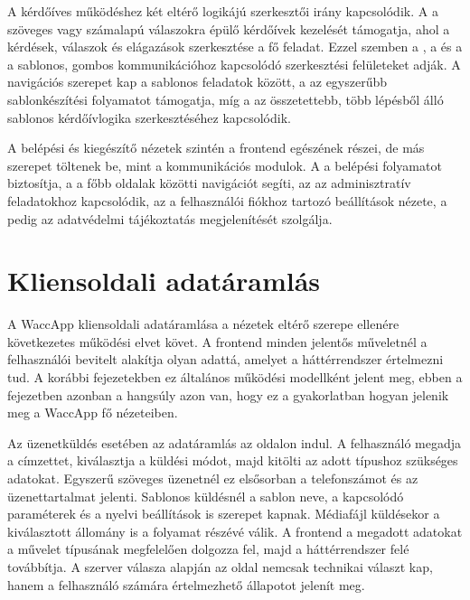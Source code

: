 A kérdőíves működéshez két eltérő logikájú szerkesztői irány kapcsolódik. A  a szöveges vagy számalapú válaszokra épülő kérdőívek kezelését támogatja, ahol a kérdések, válaszok és elágazások szerkesztése a fő feladat. Ezzel szemben a , a  és a  a sablonos, gombos kommunikációhoz kapcsolódó szerkesztési felületeket adják. A  navigációs szerepet kap a sablonos feladatok között, a  az egyszerűbb sablonkészítési folyamatot támogatja, míg a  az összetettebb, több lépésből álló sablonos kérdőívlogika szerkesztéséhez kapcsolódik. 

A belépési és kiegészítő nézetek szintén a frontend egészének részei, de más szerepet töltenek be, mint a kommunikációs modulok. A  a belépési folyamatot biztosítja, a  a főbb oldalak közötti navigációt segíti, az  az adminisztratív feladatokhoz kapcsolódik, az  a felhasználói fiókhoz tartozó beállítások nézete, a  pedig az adatvédelmi tájékoztatás megjelenítését szolgálja. 

\section{Kliensoldali adatáramlás}

A WaccApp kliensoldali adatáramlása a nézetek eltérő szerepe ellenére következetes működési elvet követ. A frontend minden jelentős műveletnél a felhasználói bevitelt alakítja olyan adattá, amelyet a háttérrendszer értelmezni tud. A korábbi fejezetekben ez általános működési modellként jelent meg, ebben a fejezetben azonban a hangsúly azon van, hogy ez a gyakorlatban hogyan jelenik meg a WaccApp fő nézeteiben. 

Az üzenetküldés esetében az adatáramlás az  oldalon indul. A felhasználó megadja a címzettet, kiválasztja a küldési módot, majd kitölti az adott típushoz szükséges adatokat. Egyszerű szöveges üzenetnél ez elsősorban a telefonszámot és az üzenettartalmat jelenti. Sablonos küldésnél a sablon neve, a kapcsolódó paraméterek és a nyelvi beállítások is szerepet kapnak. Médiafájl küldésekor a kiválasztott állomány is a folyamat részévé válik. A frontend a megadott adatokat a művelet típusának megfelelően dolgozza fel, majd a háttérrendszer felé továbbítja. A szerver válasza alapján az oldal nemcsak technikai választ kap, hanem a felhasználó számára értelmezhető állapotot jelenít meg. 

